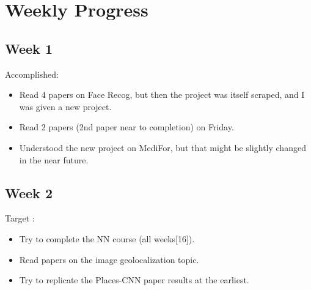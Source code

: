 \documentclass{article}
\begin{document}
\section{Weekly Progress}
\subsection{Week 1}
Accomplished:
\begin{itemize}
\item Read 4 papers on Face Recog, but then the project was itself scraped, and I was given a new project.
\item Read 2 papers (2nd paper near to completion) on Friday.
\item Understood the new project on MediFor, but that might be slightly changed in the near future.
\end{itemize}

\subsection{Week 2}
Target :
\begin{itemize}
\item Try to complete the NN course (all weeks[16]).
\item Read papers on the image geolocalization topic.
\item Try to replicate the Places-CNN paper results at the earliest.
\end{itemize}
\end{document}
